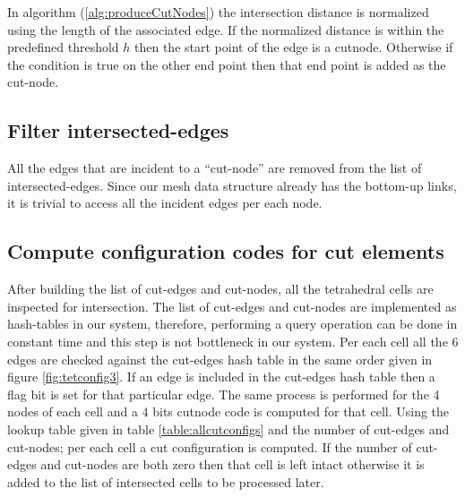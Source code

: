 In algorithm (\ref{alg:produceCutNodes}) the intersection distance is normalized using the length of the associated edge.
If the normalized distance is within the predefined threshold $h$ then the start point of the edge is a cutnode. Otherwise
if the condition is true on the other end point then that end point is added as the cut-node.

\subsection{Filter intersected-edges}
All the edges that are incident to a ``cut-node'' are removed from the list of intersected-edges. Since our mesh data structure 
already has the bottom-up links, it is trivial to access all the incident edges per each node. 


\subsection{Compute configuration codes for cut elements}
\label{sec:cutconfigs}
After building the list of cut-edges and cut-nodes, all the tetrahedral cells are inspected for intersection. 
The list of cut-edges and cut-nodes are implemented as hash-tables in our system, therefore, performing a query operation can be done 
in constant time and this step is not bottleneck in our system. Per each cell all the 6 edges are checked against the cut-edges hash table 
in the same order given in figure \ref{fig:tetconfig3}. If an edge is included in the cut-edges hash table then a flag bit is set for that
particular edge. The same process is performed for the 4 nodes of each cell and a 4 bits cutnode code is computed for that cell.
Using the lookup table given in table \ref{table:allcutconfigs} and the number of cut-edges and cut-nodes; per each cell a cut configuration
is computed.  If the number of cut-edges and cut-nodes are both zero then that cell is left intact otherwise it is added to the list of intersected cells
to be processed later.

